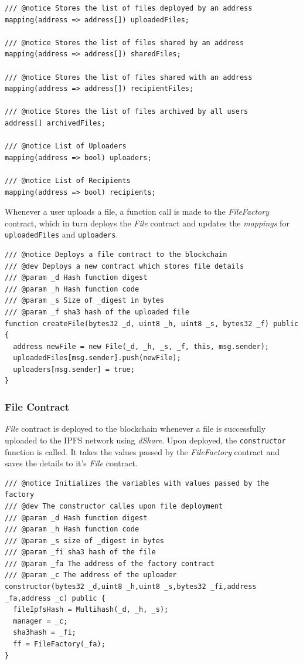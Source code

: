 \documentclass[]{article}
\begin{document}
\begin{verbatim}
/// @notice Stores the list of files deployed by an address
mapping(address => address[]) uploadedFiles;

/// @notice Stores the list of files shared by an address
mapping(address => address[]) sharedFiles;

/// @notice Stores the list of files shared with an address
mapping(address => address[]) recipientFiles;

/// @notice Stores the list of files archived by all users
address[] archivedFiles;

/// @notice List of Uploaders
mapping(address => bool) uploaders;

/// @notice List of Recipients
mapping(address => bool) recipients;
\end{verbatim}

		Whenever a user uploads a file, a function call is made to the \textit{FileFactory} contract, which in turn deploys the \textit{File} contract and updates the \textit{mappings} for \texttt{uploadedFiles} and \texttt{uploaders}.
		
\begin{verbatim}
/// @notice Deploys a file contract to the blockchain
/// @dev Deploys a new contract which stores file details
/// @param _d Hash function digest
/// @param _h Hash function code
/// @param _s Size of _digest in bytes
/// @param _f sha3 hash of the uploaded file
function createFile(bytes32 _d, uint8 _h, uint8 _s, bytes32 _f) public {
  address newFile = new File(_d, _h, _s, _f, this, msg.sender);
  uploadedFiles[msg.sender].push(newFile);
  uploaders[msg.sender] = true;
}
\end{verbatim}

		\subsubsection{File Contract}
		\textit{File} contract is deployed to the blockchain whenever a file is successfully uploaded to the IPFS network using \textit{dShare}. Upon deployed, the \texttt{constructor} function is called. It takes the values passed by the \textit{FileFactory} contract and saves the details to it's \textit{File} contract.
		
\begin{verbatim}
/// @notice Initializes the variables with values passed by the factory
/// @dev The constructor calles upon file deployment
/// @param _d Hash function digest
/// @param _h Hash function code
/// @param _s size of _digest in bytes
/// @param _fi sha3 hash of the file
/// @param _fa The address of the factory contract
/// @param _c The address of the uploader
constructor(bytes32 _d,uint8 _h,uint8 _s,bytes32 _fi,address _fa,address _c) public {
  fileIpfsHash = Multihash(_d, _h, _s);
  manager = _c;
  sha3hash = _fi;
  ff = FileFactory(_fa);
}
\end{verbatim}
\end{document}
